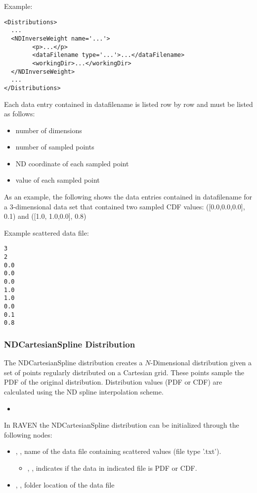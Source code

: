 Example:
\begin{lstlisting}[style=XML]
<Distributions>
  ...
  <NDInverseWeight name='...'>
        <p>...</p>
        <dataFilename type='...'>...</dataFilename>
        <workingDir>...</workingDir>
  </NDInverseWeight>
  ...
</Distributions>
\end{lstlisting}

Each data entry contained in data\textunderscore filename is listed row by row and must be listed as follows:
\begin{itemize}
\item number of dimensions
\item number of sampled points
\item ND coordinate of each sampled point
\item value of each sampled point
\end{itemize}

As an example, the following shows the data entries contained in data\textunderscore filename for a 3-dimensional data set that contained two sampled CDF values: ([0.0,0.0,0.0], 0.1) and ([1.0, 1.0,0.0], 0.8)

Example scattered data file:
\begin{lstlisting}
3
2
0.0
0.0
0.0
1.0
1.0
0.0
0.1
0.8
\end{lstlisting}

\subsubsection{NDCartesianSpline Distribution}
\label{NDCartesianSpline}

The NDCartesianSpline distribution creates a $N$-Dimensional distribution given a set of points
regularly distributed on a Cartesian grid. These points sample the PDF of the original distribution.
Distribution values (PDF or CDF) are calculated using the ND spline
interpolation scheme.


%
\attrsIntro
\vspace{-5mm}
\begin{itemize}
\itemsep0em
\item \nameDescription
\end{itemize}
\vspace{-5mm}


In RAVEN the NDCartesianSpline distribution can be initialized through the following nodes:
\begin{itemize}
\item {}, ,  name of the data file containing scattered values (file type '.txt').
\begin{itemize}
\item {}, , indicates if the data in indicated file is PDF or CDF.
\end{itemize}
\item {}, , folder location of the data file
\end{itemize}

